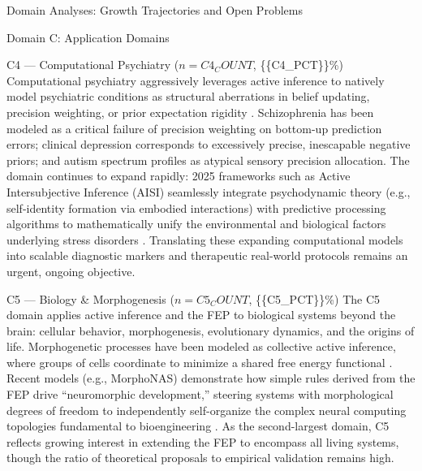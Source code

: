 \documentclass[
  ignorenonframetext,
]{beamer}
\begin{document}
\begin{frame}{Domain Analyses: Growth Trajectories and Open Problems
\label{sec:subfield_analyses}}
\begin{block}{Domain C: Application Domains}
\begin{block}{C4 --- Computational Psychiatry (\(n = {{C4_COUNT}}\),
\{\{C4\_PCT\}\}\%)}
\protect{}\label{c4-computational-psychiatry-n-c4_count-c4_pct}
Computational psychiatry aggressively leverages active inference to
natively model psychiatric conditions as structural aberrations in
belief updating, precision weighting, or prior expectation rigidity
\citep{smith2021computational}. Schizophrenia has been modeled as a
critical failure of precision weighting on bottom-up prediction errors;
clinical depression corresponds to excessively precise, inescapable
negative priors; and autism spectrum profiles as atypical sensory
precision allocation. The domain continues to expand rapidly: 2025
frameworks such as Active Intersubjective Inference (AISI) seamlessly
integrate psychodynamic theory (e.g., self-identity formation via
embodied interactions) with predictive processing algorithms to
mathematically unify the environmental and biological factors underlying
stress disorders \citep{smith2025active}. Translating these expanding
computational models into scalable diagnostic markers and therapeutic
real-world protocols remains an urgent, ongoing objective.
\end{block}

\begin{block}{C5 --- Biology \& Morphogenesis (\(n = {{C5_COUNT}}\),
\{\{C5\_PCT\}\}\%)}
\protect{}\label{c5-biology-morphogenesis-n-c5_count-c5_pct}
The C5 domain applies active inference and the FEP to biological systems
beyond the brain: cellular behavior, morphogenesis, evolutionary
dynamics, and the origins of life. Morphogenetic processes have been
modeled as collective active inference, where groups of cells coordinate
to minimize a shared free energy functional
\citep{kuchling2020morphogenesis, levin2022technological}. Recent models
(e.g., MorphoNAS) demonstrate how simple rules derived from the FEP
drive ``neuromorphic development,'' steering systems with morphological
degrees of freedom to independently self-organize the complex neural
computing topologies fundamental to bioengineering
\citep{levin2025morphonas}. As the second-largest domain, C5 reflects
growing interest in extending the FEP to encompass all living systems,
though the ratio of theoretical proposals to empirical validation
remains high.
\end{block}
\end{block}


\end{frame}
\end{document}
